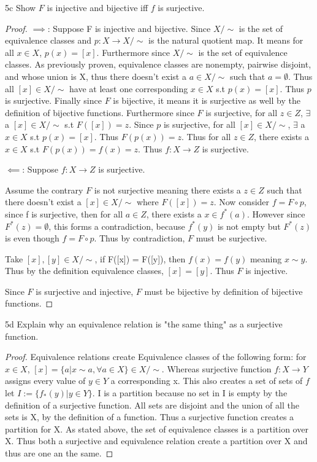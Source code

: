 \documentclass{article}
\newcommand{\rarr}[0]{\rightarrow}
\begin{document}
\begin{QU}{5c}\label{Question 5c.}
	Show $F$ is injective and bijective iff $f$ is surjective.
\end{QU}
\begin{proof}
	$\implies$: Suppose F is injective and bijective. Since $X/\sim$ is the set of equivalence classes and $p: X \rarr X/\sim$ is the natural quotient map. It means for all $x \in X$, $p(x) = [x]$. Furthermore since $X/\sim$ is the set of equivalence classes. As previously proven, equivalence classes are nonempty, pairwise disjoint, and whose union is X, thus there doesn't exist a $a \in X/\sim$ such that $a = \emptyset$. Thus all $[x] \in X/\sim$ have at least one corresponding $x\in X$ s.t $p(x) = [x]$. Thus $p$ is surjective. Finally since $F$ is bijective, it means it is surjective as well by the definition of bijective functions. Furthermore since $F$ is surjective, for all $z \in Z$, $\exists$ a $[x] \in X/\sim$ s.t $F([x]) = z$. Since $p$ is surjective, for all $[x] \in X/\sim$, $\exists$ a $x \in X$ s.t $p(x) = [x]$. Thus $F(p(x)) = z$. Thus for all $z \in Z$, there exists a $x \in X$ s.t $F(p(x)) = f(x) = z$. Thus $f: X \rarr Z$ is surjective.

	$\impliedby$: Suppose $f: X \rarr Z$ is surjective. 
	
	Assume the contrary $F$ is not surjective meaning there exists a $z \in Z$ such that there doesn't exist a $[x] \in X/\sim$ where $F([x]) = z$. Now consider $f = F \circ p$, since f is surjective, then for all $a \in Z$, there exists a $x \in f^*(a)$. However since $F^*(z) = \emptyset$, this forms a contradiction, because $f^*(y)$ is not empty but $F^*(z)$ is even though $f = F \circ p$. Thus by contradiction, $F$ must be surjective.

	Take $[x], [y] \in X/\sim$, if F([x]) = F([y]), then $f(x) = f(y)$ meaning $x \sim y$. Thus by the definition equivalence classes, $[x] = [y]$. Thus $F$ is injective. 

	Since $F$ is surjective and injective, $F$ must be bijective by definition of bijective functions.

 
	
\end{proof}

\begin{QU}{5d}\label{Question 5d.}
	Explain why an equivalence relation is "the same thing" as a surjective function. 
\end{QU}
\begin{proof}
	Equivalence relations create Equivalence classes of the following form: for $x \in X$, $[x] = \{a | x \sim a, \forall a \in X\} \in X/\sim$. Whereas surjective function $f: X \rarr Y$ assigns every value of $y \in Y$ a corresponding x. This also creates a set of sets of $f$ let $I:= \{f_*(y) | y \in Y\}$. I is a partition because no set in I is empty by the definition of a surjective function. All sets are disjoint and the union of all the sets is X, by the definition of a function. Thus a surjective function creates a partition for X. As stated above, the set of equivalence classes is a partition over X. Thus both a surjective and equivalence relation create a partition over X and thus are one an the same.
\end{proof}
\end{document}
